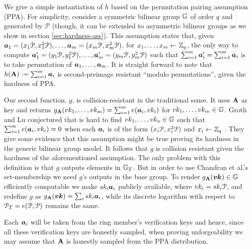 We give a simple instantiation of $h$ based on the permutation pairing assumption (PPA). For simplicity, consider a symmetric bilinear group $\mathbb{G}$ of order $q$ and generated by $\mathcal{P}$ (though, it can be extended to asymmetric bilinear groups as we show in section \ref{sec:hardness-ass}). This assumption states that, given ${\boldsymbol{a}}_1 = (x_1\mathcal{P},x_1^2\mathcal{P}),\ldots,{\boldsymbol{a}}_m=(x_m\mathcal{P},x^2_m\mathcal{P})$, for $x_1,\ldots,x_m\gets\mathbb{Z}_q$, the only way to compute ${\boldsymbol{a}}'_1=(y_1\mathcal{P},y_1^2\mathcal{P}),\ldots,{\boldsymbol{a}}'_m=(y_m\mathcal{P},y_m^2\mathcal{P})$ such that $\sum_{i=1}^m {\boldsymbol{a}}'_i = \sum_{i=1}^m{\boldsymbol{a}}_i$ is to take permutation of ${\boldsymbol{a}}_1,\ldots,{\boldsymbol{a}}_m$.  It is straight forward to note that $h(\mathbf{{A}}) := \sum_{i=1}^m {\boldsymbol{a}}_i$ is second-preimage resistant ``modulo permutations'', given the hardness of PPA.

Our second function, $g$, is collision-resistant in the traditional sense. It uses $\mathbf{{A}}$ as key and returns $g_{\mathbf{{A}}}(vk_1,\ldots,vk_m) = \sum_{i=1}^m e({\boldsymbol{a}}_i,vk_i)$ for $vk_1,\ldots,vk_m\in\mathbb{G}$.  Groth and Lu conjectured that is hard to find $vk_1,\ldots,vk_n\in\mathbb{G}$ such that $\sum_{i=1}^m e({\boldsymbol{a}}_i,vk_i)=0$ when each ${\boldsymbol{a}}_i$ is of the form $(x_i\mathcal{P},x_i^2\mathcal{P})$ and $x_i\gets\mathbb{Z}_q$ \cite{AC:GroLu07}. They give some evidence that this assumption might be true proving its hardness in the generic bilinear group model. It follows that $g$ is collision resistant given the hardness of the aforementioned assumption. The only problem with this definition is that $g$ outputs elements in $\mathbb{G}_T$. But in order to use Chandran et al.'s set-membership we need $g$'s outputs in the base group. To render $g_{\mathbf{{A}}}({\boldsymbol{vk}})\in\mathbb{G}$ efficiently computable we make $sk_i{\boldsymbol{a}}_i$ publicly available, where $vk_i = sk_i\mathcal{P}$, and redefine $g$ as $g_{\mathbf{{A}}}({\boldsymbol{vk}}) = \sum_i sk_i{\boldsymbol{a}}_i$, while its discrete logarithm with respect to $\mathcal{P}_T = e(\mathcal{P},\mathcal{P})$ remains the same.

Each ${\boldsymbol{a}}_i$ will be taken from the ring member's verification keys and hence, since all these verification keys are honestly sampled, when proving unforgeability we may assume that $\mathbf{{A}}$ is honestly sampled from the PPA distribution. %

